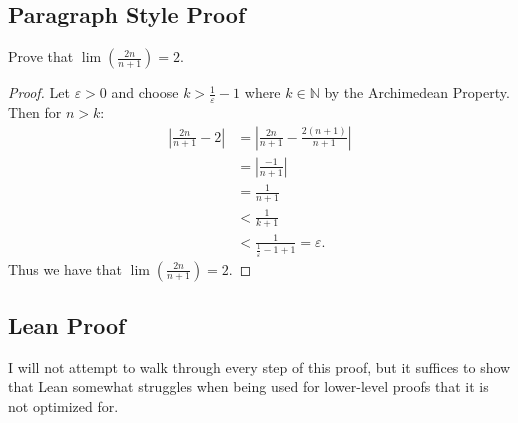 \documentclass[
  letterpaper,
]{scrreprt}
\newcommand{\excl}[1]{}
\theoremstyle{remark}
\begin{document}
\hypertarget{paragraph-style-proof-3}{%
\subsection{Paragraph Style Proof}\label{paragraph-style-proof-3}}

\begin{thm}
Prove that \(\lim(\frac{2n}{n + 1}) = 2.\)

\end{thm}

\begin{proof}

Let \(\varepsilon > 0\) and choose \(k > \frac{1}{\varepsilon} - 1\)
where \(k \in \mathbb{N}\) by the Archimedean Property. Then for
\(n > k:\) \begin{align*}
\left|\frac{2n}{n + 1} - 2\right| & = \left|\frac{2n}{n + 1} - \frac{2(n + 1)}{n + 1}\right|\\
& = \left|\frac{-1}{n + 1}\right|\\
& = \frac{1}{n + 1}\\
& < \frac{1}{k + 1}\\
& < \frac{1}{\frac{1}{\varepsilon} - 1 + 1} = \varepsilon.
\end{align*} Thus we have that \(\lim(\frac{2n}{n + 1}) = 2.\)
\excl{~□}\qedhere

\end{proof}

\hypertarget{lean-proof-3}{%
\subsection{Lean Proof}\label{lean-proof-3}}

I will not attempt to walk through every step of this proof, but it
suffices to show that Lean somewhat struggles when being used for
lower-level proofs that it is not optimized for.
\end{document}
